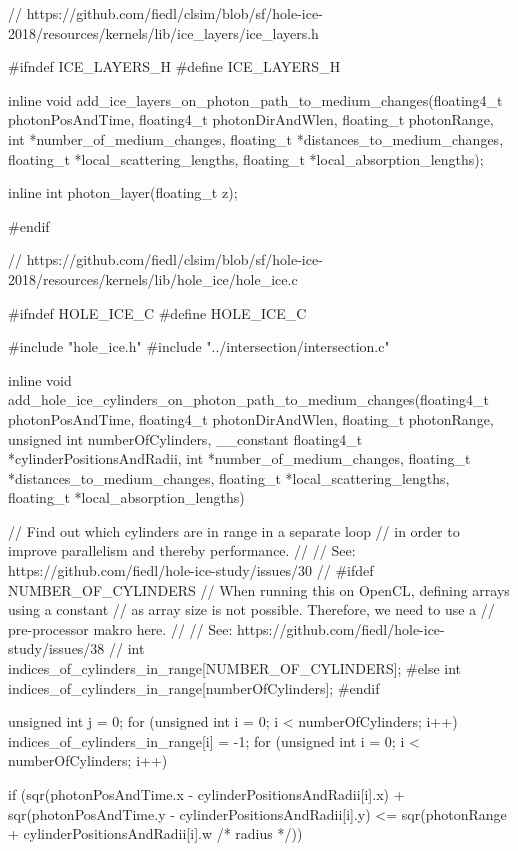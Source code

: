 \begin{ccode}
// https://github.com/fiedl/clsim/blob/sf/hole-ice-2018/resources/kernels/lib/ice_layers/ice_layers.h

#ifndef ICE_LAYERS_H
#define ICE_LAYERS_H

inline void add_ice_layers_on_photon_path_to_medium_changes(floating4_t photonPosAndTime, floating4_t photonDirAndWlen, floating_t photonRange, int *number_of_medium_changes, floating_t *distances_to_medium_changes, floating_t *local_scattering_lengths, floating_t *local_absorption_lengths);

inline int photon_layer(floating_t z);

#endif
\end{ccode}

\begin{ccode}
// https://github.com/fiedl/clsim/blob/sf/hole-ice-2018/resources/kernels/lib/hole_ice/hole_ice.c

#ifndef HOLE_ICE_C
#define HOLE_ICE_C

#include "hole_ice.h"
#include "../intersection/intersection.c"

inline void add_hole_ice_cylinders_on_photon_path_to_medium_changes(floating4_t photonPosAndTime, floating4_t photonDirAndWlen, floating_t photonRange, unsigned int numberOfCylinders, __constant floating4_t *cylinderPositionsAndRadii, int *number_of_medium_changes, floating_t *distances_to_medium_changes, floating_t *local_scattering_lengths, floating_t *local_absorption_lengths)
{
  // Find out which cylinders are in range in a separate loop
  // in order to improve parallelism and thereby performance.
  //
  // See: https://github.com/fiedl/hole-ice-study/issues/30
  //
  #ifdef NUMBER_OF_CYLINDERS
    // When running this on OpenCL, defining arrays using a constant
    // as array size is not possible. Therefore, we need to use a
    // pre-processor makro here.
    //
    // See: https://github.com/fiedl/hole-ice-study/issues/38
    //
    int indices_of_cylinders_in_range[NUMBER_OF_CYLINDERS];
  #else
    int indices_of_cylinders_in_range[numberOfCylinders];
  #endif
  {
    unsigned int j = 0;
    for (unsigned int i = 0; i < numberOfCylinders; i++) {
      indices_of_cylinders_in_range[i] = -1;
    }
    for (unsigned int i = 0; i < numberOfCylinders; i++) {
      if (sqr(photonPosAndTime.x - cylinderPositionsAndRadii[i].x) +
          sqr(photonPosAndTime.y - cylinderPositionsAndRadii[i].y) <=
          sqr(photonRange + cylinderPositionsAndRadii[i].w /* radius */))
      {

}}}}
\end{ccode}
